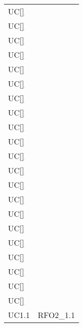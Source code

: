 \begin{longtable}{C{6cm} C{6cm}}
    UC\ref{} &  \\

	UC\ref{} &  \\

    UC\ref{} &  \\

	UC\ref{} &  \\

    UC\ref{} &  \\

	UC\ref{} &  \\

    UC\ref{} &  \\

	UC\ref{} &  \\

    UC\ref{} &  \\

    UC\ref{} &  \\

	UC\ref{} &  \\

    UC\ref{} &  \\

	UC\ref{} &  \\

    UC\ref{} &  \\

	UC\ref{} &  \\

    UC\ref{} &  \\

	UC\ref{} &  \\

    UC\ref{} &  \\

	UC\ref{} &  \\

    UC\ref{} &  \\

	UC\ref{} &  \\

	UC1.1 & RFO2\_1.1 \\
	

\end{longtable}
